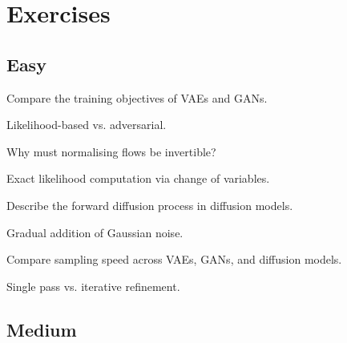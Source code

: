 
\section*{Exercises}

\subsection*{Easy}

\begin{exercisebox}[easy]
\begin{problem}
Compare the training objectives of VAEs and GANs.
\end{problem}
\begin{hintbox}
Likelihood-based vs. adversarial.
\end{hintbox}
\end{exercisebox}


\begin{exercisebox}[easy]
\begin{problem}
Why must normalising flows be invertible?
\end{problem}
\begin{hintbox}
Exact likelihood computation via change of variables.
\end{hintbox}
\end{exercisebox}


\begin{exercisebox}[easy]
\begin{problem}
Describe the forward diffusion process in diffusion models.
\end{problem}
\begin{hintbox}
Gradual addition of Gaussian noise.
\end{hintbox}
\end{exercisebox}


\begin{exercisebox}[easy]
\begin{problem}
Compare sampling speed across VAEs, GANs, and diffusion models.
\end{problem}
\begin{hintbox}
Single pass vs. iterative refinement.
\end{hintbox}
\end{exercisebox}


\subsection*{Medium}

